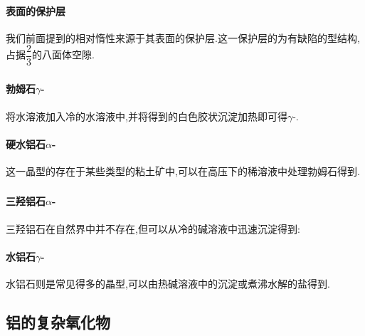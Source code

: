 \documentclass{ctexart}
\begin{document}
\paragraph{表面的保护层}
我们前面提到的相对惰性来源于其表面的保护层.这一保护层的为有缺陷的型结构,占据$\dfrac23$的八面体空隙.
\subsubsection{}
\paragraph{勃姆石$\gamma$-}
将水溶液加入冷的水溶液中,并将得到的白色胶状沉淀加热即可得$\gamma$-.
\paragraph{硬水铝石$\alpha$-}
这一晶型的存在于某些类型的粘土矿中,可以在高压下的稀溶液中处理勃姆石得到.
\subsubsection{}
\paragraph{三羟铝石$\alpha$-}
三羟铝石在自然界中并不存在,但可以从冷的碱溶液中迅速沉淀得到:
\begin{center}
\end{center}
\paragraph{水铝石$\gamma$-}
水铝石则是常见得多的晶型,可以由热碱溶液中的沉淀或煮沸水解的盐得到.
\subsection{铝的复杂氧化物}
\end{document}

